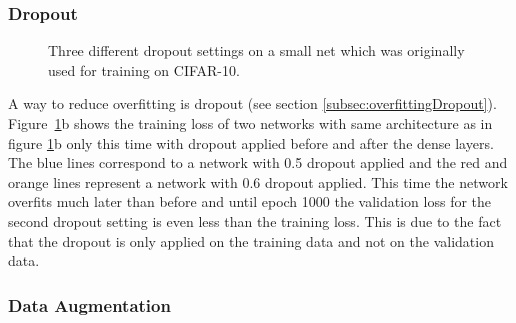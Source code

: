 	\subsubsection*{Dropout}
	\begin{figure}[htb]
		\centering
		\caption{Three different dropout settings on a small net which was originally used for training on CIFAR-10.}
		\label{fig:overfittingNet}
	\end{figure}
	A way to reduce overfitting is dropout {(see section \ref{subsec:overfittingDropout})}. Figure~\ref{fig:overfittingNet}b shows the training loss of two networks with same architecture as in figure \ref{fig:overfittingNet}b only this time with dropout applied before and after the dense layers. The blue lines correspond to a network with 0.5 dropout applied and the red and orange lines represent a network with 0.6 dropout applied. This time the network overfits much later than before and until epoch 1000 the validation loss for the second dropout setting is even less than the training loss. This is due to the fact that the dropout is only applied on the training data and not on the validation data.

	
	\subsubsection*{Data Augmentation}
	
